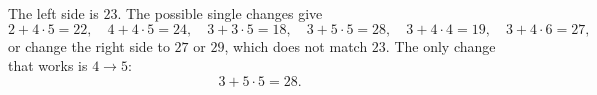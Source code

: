 The left side is $23$. The possible single changes give
\[2+4\cdot5=22,\quad4+4\cdot5=24,\quad3+3\cdot5=18,\quad3+5\cdot5=28,\quad3+4\cdot4=19,\quad3+4\cdot6=27,\]
or change the right side to $27$ or $29$, which does not match $23$. The only change that works is $4\to5$:
\[\boxed{3+5\cdot5=28}.\]
